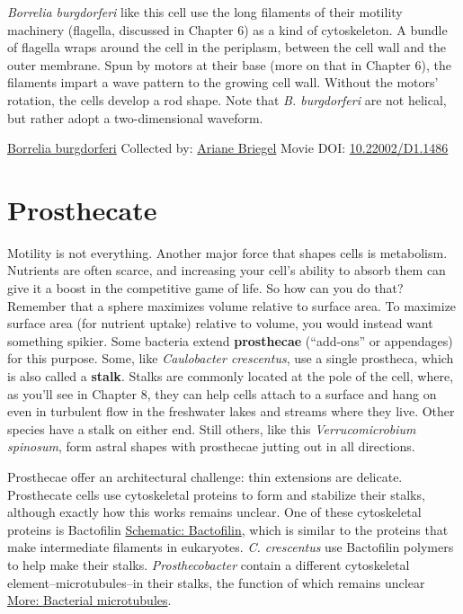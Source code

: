\documentclass[]{tufte-book}
\begin{document}
\emph{Borrelia burgdorferi} like this cell use the long filaments of their motility machinery (flagella, discussed in Chapter 6) as a kind of cytoskeleton. A bundle of flagella wraps around the cell in the periplasm, between the cell wall and the outer membrane. Spun by motors at their base (more on that in Chapter 6), the filaments impart a wave pattern to the growing cell wall. Without the motors' rotation, the cells develop a rod shape. Note that \emph{B. burgdorferi} are not helical, but rather adopt a two-dimensional waveform.



\hypertarget{htmlwidget-96bd6ab4758a7e59edcb}{}

\label{fig:3-5a}\protect\hyperlink{tree}{Borrelia burgdorferi} Collected by: \protect\hyperlink{ariane_briegel}{Ariane Briegel} Movie DOI: \href{https://doi.org/10.22002/D1.1486}{10.22002/D1.1486}

\hypertarget{prosthecate}{%
\section{Prosthecate}\label{prosthecate}}

Motility is not everything. Another major force that shapes cells is metabolism. Nutrients are often scarce, and increasing your cell's ability to absorb them can give it a boost in the competitive game of life. So how can you do that? Remember that a sphere maximizes volume relative to surface area. To maximize surface area (for nutrient uptake) relative to volume, you would instead want something spikier. Some bacteria extend \textbf{prosthecae} (``add-ons'' or appendages) for this purpose. Some, like \emph{Caulobacter crescentus}, use a single prostheca, which is also called a \textbf{stalk}. Stalks are commonly located at the pole of the cell, where, as you'll see in Chapter 8, they can help cells attach to a surface and hang on even in turbulent flow in the freshwater lakes and streams where they live. Other species have a stalk on either end. Still others, like this \emph{Verrucomicrobium spinosum}, form astral shapes with prosthecae jutting out in all directions.

Prosthecae offer an architectural challenge: thin extensions are delicate. Prosthecate cells use cytoskeletal proteins to form and stabilize their stalks, although exactly how this works remains unclear. One of these cytoskeletal proteins is Bactofilin \protect\hyperlink{Bactofilin}{Schematic: Bactofilin}, which is similar to the proteins that make intermediate filaments in eukaryotes. \emph{C. crescentus} use Bactofilin polymers to help make their stalks. \emph{Prosthecobacter} contain a different cytoskeletal element--microtubules--in their stalks, the function of which remains unclear \protect\hyperlink{Bacterial_microtubules}{More: Bacterial microtubules}.
\end{document}
